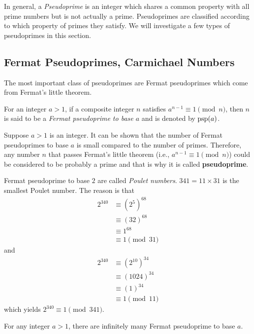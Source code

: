 \documentclass{subfile}
\begin{document}
In general, a \textit{Pseudoprime} is an integer which shares a common property with all prime numbers but is not actually a prime. Pseudoprimes are classified according to which property of primes they satisfy. We will investigate a few types of pseudoprimes in this section.

\subsection{Fermat Pseudoprimes,  Carmichael Numbers}
	The most important class of pseudoprimes are Fermat pseudoprimes which come from Fermat's little theorem.
		\begin{definition}
			For an integer $a>1$, if a composite integer $n$ satisfies $a^{n-1}\equiv 1\pmod n$, then $n$ is said to be a \textit{Fermat pseudoprime to base $a$} and is denoted by $\operatorname{psp}(a)$.
		\end{definition}
	Suppose $a>1$ is an integer. It can be shown that the number of Fermat pseudoprimes to base $a$ is small compared to the number of primes. Therefore, any number $n$ that passes Fermat's little theorem (i.e., $a^{n-1} \equiv 1 \pmod n$) could be considered to be probably a prime and that is why it is called \textbf{pseudoprime}.

		\begin{example}
			Fermat pseudoprime to base $2$ are called \textit{Poulet numbers}. $341=11\times 31$ is the smallest Poulet number. The reason is that
				\begin{align*}
					2^{340}
						& \equiv \left(2^5\right)^{68}\\
						& \equiv (32)^{68}\\
						& \equiv 1^{68}\\
						& \equiv 1 \pmod{31}
				\end{align*}
			and
				\begin{align*}
					2^{340}
						& \equiv \left(2^{10}\right)^{34}\\
						& \equiv (1024)^{34}\\
						& \equiv (1)^{34}\\
						& \equiv 1 \pmod{11}
				\end{align*}
			which yields $2^{340} \equiv 1 \pmod{341}$.
		\end{example}


		\begin{theorem}
			For any integer $a>1$, there are infinitely many Fermat pseudoprime to base $a$.
		\end{theorem}
\end{document}

